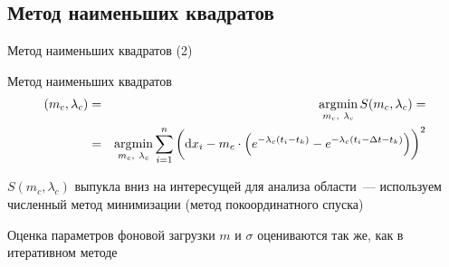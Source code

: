 \documentclass[utf8,handout]{beamer}
\DeclareMathOperator*{\argmin}{\arg\!\min}
\begin{document}
\subsection[МНК]{Метод наименьших квадратов}
\begin{frame}{Метод наименьших квадратов (2)}
\begin{block}{Метод наименьших квадратов}
\begin{eqnarray*}
\del{m_c, \lambda_c} 
  & = & \argmin\limits_{m_c,\ \lambda_c} S(m_c, \lambda_c) = \\
  & = & \argmin\limits_{m_c,\ \lambda_c} \sum\limits_{i=1}^{n} 
    \del{\dif x_i - m_c \cdot 
      \del{e^{-\lambda_c(t_i - t_k)} - 
           e^{-\lambda_c(t_i - \Delta t - t_k)}}}^2
\end{eqnarray*}
\end{block}
$S(m_c, \lambda_c)$ выпукла вниз на интересущей для анализа области~---
используем численный метод минимизации (метод покоординатного спуска)
\end{frame}


\begin{frame}{Оценка параметров фоновой загрузки}
$m$ и $\sigma$ оцениваются так же, как в итеративном методе
\end{frame}






\end{document}
